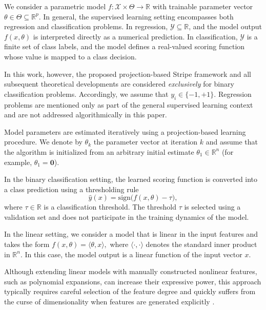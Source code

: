 \documentclass[a4paper,fleqn]{cas-sc}
\begin{document}
We consider a parametric model $f : \mathcal{X} \times \Theta \to \mathbb{R}$ with trainable parameter vector $\theta \in \Theta \subseteq \mathbb{R}^p$.
In general, the supervised learning setting encompasses both regression and classification problems. 
In regression, $\mathcal{Y} \subseteq \mathbb{R}$, and the model output $f(x,\theta)$ is interpreted directly as a numerical prediction.
In classification, $\mathcal{Y}$ is a finite set of class labels, and the model defines a real-valued scoring function whose value is mapped to a class decision.

In this work, however, the proposed projection-based Stripe framework and all subsequent theoretical developments are considered \emph{exclusively} for binary classification problems.
Accordingly, we assume that $y_i \in \{-1,+1\}$.
Regression problems are mentioned only as part of the general supervised learning context and are not addressed algorithmically in this paper.

Model parameters are estimated iteratively using a projection-based learning procedure. We denote by $\theta_k$ the parameter vector at iteration $k$ and assume that the algorithm is initialized from an arbitrary initial estimate $\theta_1 \in \mathbb{R}^n$ (for example, $\theta_1 = \mathbf{0}$).


In the binary classification setting, the learned scoring function
is converted into a class prediction using a thresholding rule
\begin{equation}
\hat{y}(x) = \mathrm{sign}\bigl(f(x,\theta) - \tau\bigr),
\end{equation}
where $\tau \in \mathbb{R}$ is a classification threshold.
The threshold $\tau$ is selected using a validation set and does not participate
in the training dynamics of the model.


In the linear setting, we consider a model that is linear in the input features and takes the form
$
f(x,\theta) = \langle \theta, x \rangle,
$
where $\langle \cdot, \cdot \rangle$ denotes the standard inner product in $\mathbb{R}^n$.
In this case, the model output is a linear function of the input vector $x$.

Although extending linear models with manually constructed nonlinear features,
such as polynomial expansions, can increase their expressive power,
this approach typically requires careful selection of the feature degree
and quickly suffers from the curse of dimensionality when features are generated explicitly \cite{bishop:2006:PRML, Hastie+al:2009}.
\end{document}
